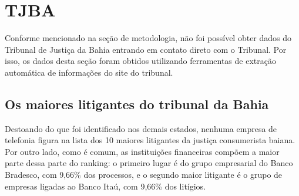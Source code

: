 \documentclass[]{report}
\begin{document}
\section{TJBA}\label{tjba}

Conforme mencionado na seção de metodologia, não foi possível obter
dados do Tribunal de Justiça da Bahia entrando em contato direto com o
Tribunal. Por isso, os dados desta seção foram obtidos utilizando
ferramentas de extração automática de informações do site do tribunal.

\subsection{Os maiores litigantes do tribunal da
Bahia}\label{os-maiores-litigantes-do-tribunal-da-bahia}

Destoando do que foi identificado nos demais estados, nenhuma empresa de
telefonia figura na lista dos 10 maiores litigantes da justiça
consumerista baiana. Por outro lado, como é comum, as instituições
financeiras compõem a maior parte dessa parte do ranking: o primeiro
lugar é do grupo empresarial do Banco Bradesco, com 9,66\% dos
processos, e o segundo maior litigante é o grupo de empresas ligadas ao
Banco Itaú, com 9,66\% dos litígios.
\end{document}
